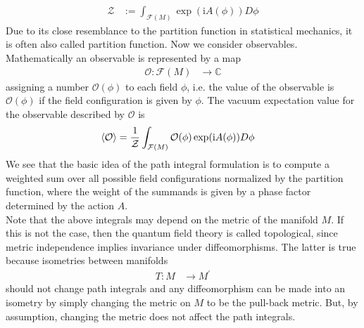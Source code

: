 \begin{align*}
  \mathcal{Z}
  &:=
  \int_{\mathcal{F}(M)}
  \exp(\mathrm{i}A(\phi))
  D\phi
\end{align*}
Due to its close resemblance to the partition function in statistical mechanics, it is often also called partition function. Now we consider observables. Mathematically an observable is represented by a map
\begin{align*}
  \mathcal{O}
  \colon
  \mathcal{F}(M)
  &\to
  \mathbb{C}
\end{align*}
assigning a number $\mathcal{O}(\phi)$ to each field $\phi$, i.e. the value of the observable is $\mathcal{O}(\phi)$ if the field configuration is given by $\phi$. The vacuum expectation value for the observable described by $\mathcal{O}$ is
\begin{align*}
  \Braket{\mathcal{O}}
  &=
  \frac{1}{\mathcal{Z}}
  \int_{\mathcal{F}(M)}
  \mathcal{O}(\phi)
  \exp(\mathrm{i}A(\phi))
  D\phi
\end{align*}
We see that the basic idea of the path integral formulation is to compute a {\glqq}weighted sum{\grqq} over all possible field configurations normalized by the partition function, where the weight of the summands is given by a phase factor determined by the action $A$.
\\
Note that the above integrals may depend on the metric of the manifold $M$. If this is not the case, then the quantum field theory is called topological, since metric independence implies invariance under diffeomorphisms. The latter is true because isometries between manifolds
\begin{align*}
  T
  \colon
  M
  &\to
  M^{\prime}
\end{align*}
should not change path integrals and any diffeomorphism can be made into an isometry by simply changing the metric on $M$ to be the pull-back metric. But, by assumption, changing the metric does not affect the path integrals.
